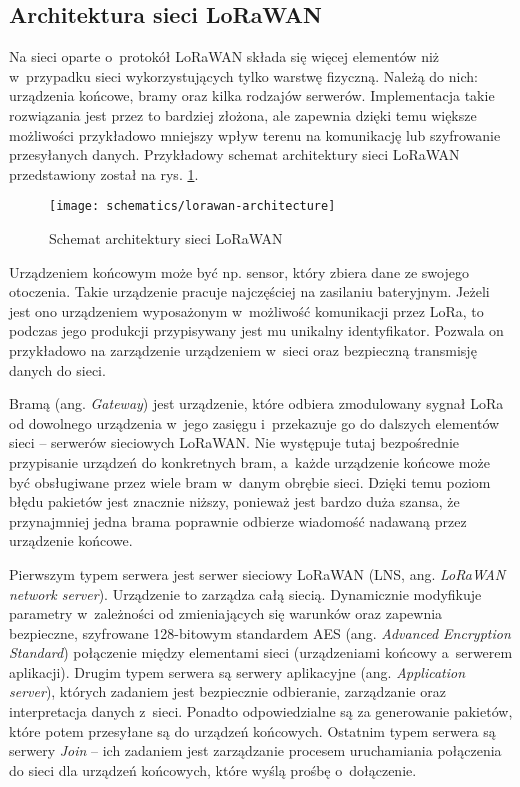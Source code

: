 \FloatBarrier

\subsection{\label{sect:lorawan-architecture}Architektura sieci LoRaWAN} Na sieci oparte o~protokół LoRaWAN składa się
więcej elementów niż w~przypadku sieci wykorzystujących tylko warstwę fizyczną. Należą do nich: urządzenia końcowe,
bramy oraz kilka rodzajów serwerów. Implementacja takie rozwiązania jest przez to bardziej złożona, ale zapewnia dzięki
temu większe możliwości przykładowo mniejszy wpływ terenu na komunikację lub szyfrowanie przesyłanych danych.
Przykładowy schemat architektury sieci LoRaWAN przedstawiony został na rys. \ref{img:lorawan-architecture}.

\begin{figure}[!htbp]
    \centering
    \texttt{[image: schematics/lorawan-architecture]}
    \caption{\label{img:lorawan-architecture}Schemat architektury sieci LoRaWAN}
\end{figure}

Urządzeniem końcowym może być np. sensor, który zbiera dane ze swojego otoczenia. Takie urządzenie pracuje najczęściej
na zasilaniu bateryjnym. Jeżeli jest ono urządzeniem wyposażonym w~możliwość komunikacji przez LoRa, to podczas jego
produkcji przypisywany jest mu unikalny identyfikator. Pozwala on przykładowo na zarządzenie urządzeniem w~sieci oraz
bezpieczną transmisję danych do sieci.

Bramą (ang. \textsl{Gateway}) jest urządzenie, które odbiera zmodulowany sygnał LoRa od dowolnego urządzenia w~jego
zasięgu i~przekazuje go do dalszych elementów sieci -- serwerów sieciowych LoRaWAN. Nie występuje tutaj bezpośrednie
przypisanie urządzeń do konkretnych bram, a~każde urządzenie końcowe może być obsługiwane przez wiele bram w~danym
obrębie sieci. Dzięki temu poziom błędu pakietów jest znacznie niższy, ponieważ jest bardzo duża szansa, że przynajmniej
jedna brama poprawnie odbierze wiadomość nadawaną przez urządzenie końcowe.

Pierwszym typem serwera jest serwer sieciowy LoRaWAN (LNS, ang. \textsl{LoRaWAN network server}). Urządzenie to zarządza
całą siecią. Dynamicznie modyfikuje parametry w~zależności od zmieniających się warunków oraz zapewnia bezpieczne,
szyfrowane 128-bitowym standardem AES (ang. \textsl{Advanced Encryption Standard}) połączenie między elementami sieci
(urządzeniami końcowy a~serwerem aplikacji). Drugim typem serwera są serwery aplikacyjne (ang. \textsl{Application
    server}), których zadaniem jest bezpiecznie odbieranie, zarządzanie oraz interpretacja danych z~sieci. Ponadto
odpowiedzialne są za generowanie pakietów, które potem przesyłane są do urządzeń końcowych. Ostatnim typem serwera są
serwery \textsl{Join} -- ich zadaniem jest zarządzanie procesem uruchamiania połączenia do sieci dla urządzeń końcowych,
które wyślą prośbę o~dołączenie.